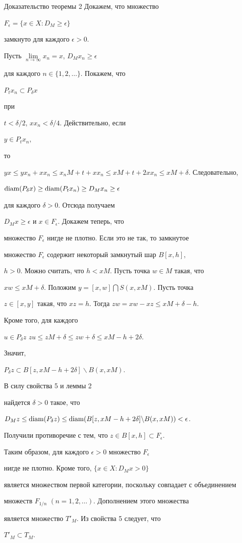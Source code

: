 \begin{pf*}{Доказательство теоремы 2} Докажем, что множество


$F_{\epsilon} = \{ x \in X : D_{M} \ge \epsilon \}$


замкнуто для каждого $\epsilon > 0$.


Пусть $\lim\limits_{n \to \infty}{x_{n}} = x$, $D_{M}x_{n} \ge \epsilon$


для каждого $n \in \{1,2,\dotsc \}$. Покажем, что


$P_{t}x_{n} \subset P_{\delta}x$ 


при


$t < \delta /2$, $xx_{n} < \delta /4$. Действительно, если


$y \in P_{t}x_{n}$,


то


$yx \le yx_{n} + xx_{n} \le x_{n}M + t + xx_{n} \le


xM + t + 2xx_{n} \le xM + \delta$. Следовательно, 


$\operatorname{diam}(P_{\delta}x) \ge \operatorname{diam}(P_{t}x_{n}) \ge D_{M}x_{n} \ge \epsilon$


для каждого $\delta > 0$. Отсюда получаем


$D_{M}x \ge \epsilon$ и $x \in F_{\epsilon}$. Докажем теперь, что


множество $F_{\epsilon}$ нигде не плотно. Если это не так, то замкнутое


множество $F_{\epsilon}$ содержит некоторый замкнутый шар $B[x,h]$,


$h > 0$. Можно считать, что $h < xM$. Пусть точка $w \in M$ такая, что


$xw \le xM + \delta$. Положим $y = [x,w]\bigcap S(x,xM)$. Пусть точка


$z \in [x,y]$ такая, что $xz = h$. Тогда $zw = xw - xz \le xM + \delta -h$.


Кроме того, для каждого


$u \in P_{\delta}z$\; $zu \le zM+\delta\le zw+\delta \le xM - h + 2\delta$.


Значит, 


$P_{\delta}z \subset B[z,xM - h + 2\delta]\backslash B(x,xM)$.


В силу свойства 5 и леммы 2


найдется $\delta > 0$ такое, что


$D_{M}z \le \diam(P_{\delta}z) \le


\diam(B[z,xM - h + 2\delta]\backslash B(x,xM)) < \epsilon$.


Получили противоречие с тем, что $z \in B[x,h] \subset F_{\epsilon}$.


Таким образом, для каждого $\epsilon > 0$ множество $F_{\epsilon}$


нигде не плотно. Кроме того, $\{x \in X : D_{M}x > 0 \}$


является множеством первой категории, поскольку совпадает с объединением


множеств $F_{1/n}$ $(n = 1,2,\dotsc)$. Дополнением этого множества


является множество $T'_{M}$. Из свойства 5 следует, что


$T'_{M} \subset T_{M}$.


\end{pf*}
